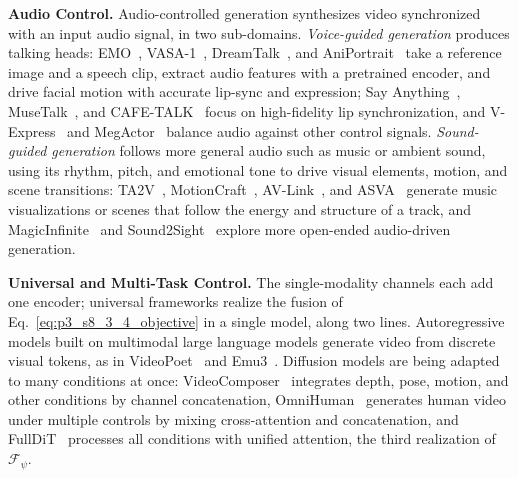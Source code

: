 \noindent\textbf{Audio Control.} Audio-controlled generation synthesizes video synchronized with an input audio signal, in two sub-domains.
\emph{Voice-guided generation} produces talking heads: EMO~\cite{tian2024emoemoteportraitalive}, VASA-1~\cite{xu2024vasa1lifelikeaudiodriventalking}, DreamTalk~\cite{ma2023dreamtalk}, and AniPortrait~\cite{wei2024aniportrait} take a reference image and a speech clip, extract audio features with a pretrained encoder, and drive facial motion with accurate lip-sync and expression; Say Anything~\cite{ma2025sayanythingaudiodrivenlipsynchronization}, MuseTalk~\cite{zhang2025musetalkrealtimehighfidelityvideo}, and CAFE-TALK~\cite{chen2025cafetalkgenerating3dtalking} focus on high-fidelity lip synchronization, and V-Express~\cite{wang2024vexpressconditionaldropoutprogressive} and MegActor~\cite{yang2024megactorharnesspowerraw} balance audio against other control signals.
\emph{Sound-guided generation} follows more general audio such as music or ambient sound, using its rhythm, pitch, and emotional tone to drive visual elements, motion, and scene transitions: TA2V~\cite{10420468}, MotionCraft~\cite{aira2024motioncraftphysicsbasedzeroshotvideo}, AV-Link~\cite{hajiali2025avlinktemporallyaligneddiffusionfeatures}, and ASVA~\cite{linz2024asva} generate music visualizations or scenes that follow the energy and structure of a track, and MagicInfinite~\cite{yi2025magicinfinitegeneratinginfinitetalking} and Sound2Sight~\cite{cherian2020sound2sightgeneratingvisualdynamics} explore more open-ended audio-driven generation.

\noindent\textbf{Universal and Multi-Task Control.} The single-modality channels each add one encoder; universal frameworks realize the fusion of Eq.~\eqref{eq:p3_s8_3_4_objective} in a single model, along two lines. Autoregressive models built on multimodal large language models generate video from discrete visual tokens, as in VideoPoet~\cite{kondratyuk2024videopoetlargelanguagemodel} and Emu3~\cite{wang2024emu3}. Diffusion models are being adapted to many conditions at once: VideoComposer~\cite{wang2023videocomposercompositionalvideosynthesis} integrates depth, pose, motion, and other conditions by channel concatenation, OmniHuman~\cite{lin2025omnihuman1rethinkingscalinguponestage} generates human video under multiple controls by mixing cross-attention and concatenation, and FullDiT~\cite{ju2025fullditmultitaskvideogenerative} processes all conditions with unified attention, the third realization of $\mathcal{F}_\psi$.

